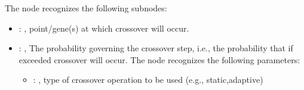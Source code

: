 \begin{itemize}
\begin{itemize}
\begin{itemize}
              The  node recognizes the following subnodes:
              \begin{itemize}
                \item {}: ,
                  point/gene(s) at which crossover will occur.

                \item {}: ,
                  The probability governing the crossover step, i.e., the probability that if
                  exceeded crossover will occur.
                  The  node recognizes the following parameters:
                    \begin{itemize}
                      \item {}: ,
                        type of crossover operation to be used (e.g., static,adaptive)
                  \end{itemize}
              \end{itemize}


\end{itemize}
\end{itemize}
\end{itemize}
